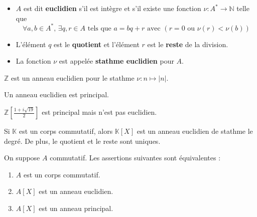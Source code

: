 
	\begin{definition}
		\begin{itemize}
			\item $A$ est dit \textbf{euclidien} s'il est intègre et s'il existe une fonction $\nu : A^* \rightarrow \mathbb{N}$ telle que
			\[ \forall a, b \in A^*, \, \exists q, r \in A \text{ tels que } a = bq+r \text{ avec } (r = 0 \text{ ou } \nu(r) < \nu(b)) \]
			\item L'élément $q$ est le \textbf{quotient} et l'élément $r$ est le \textbf{reste} de la division.
			\item La fonction $\nu$ est appelée \textbf{stathme euclidien} pour $A$.
		\end{itemize}
	\end{definition}

	\begin{example}
		$\mathbb{Z}$ est un anneau euclidien pour le stathme $\nu : n \mapsto \vert n \vert$.
	\end{example}

	\begin{proposition}
		Un anneau euclidien est principal.
	\end{proposition}


	\begin{cexample}
		$\mathbb{Z} \left[ \frac{1 + i\sqrt{19}}{2} \right]$ est principal mais n'est pas euclidien.
	\end{cexample}


	\begin{theorem}
		Si $\mathbb{K}$ est un corps commutatif, alors $\mathbb{K}[X]$ est un anneau euclidien de stathme le degré. De plus, le quotient et le reste sont uniques.
	\end{theorem}

	\begin{corollary}
		On suppose $A$ commutatif. Les assertions suivantes sont équivalentes :
		\begin{enumerate}[label=(\roman*)]
			\item $A$ est un corps commutatif.
			\item $A[X]$ est un anneau euclidien.
			\item $A[X]$ est un anneau principal.
		\end{enumerate}
	\end{corollary}

